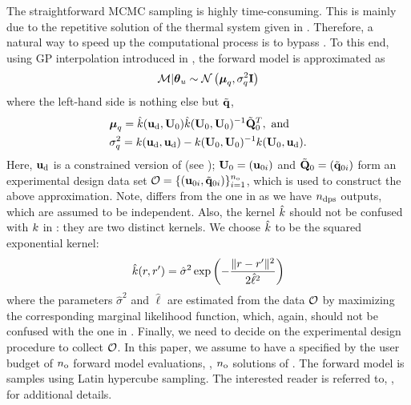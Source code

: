 The straightforward MCMC sampling is highly time-consuming. This is mainly due to the repetitive solution of the thermal system given in . Therefore, a natural way to speed up the computational process is to bypass . To this end, using GP interpolation introduced in , the forward model is approximated as
\begin{equation} \elabel{gp-approximation}
  \model | \vparam_\u \sim \gaussian{\vMean_\T}{\sigma^2_\T \mI}
\end{equation}
where the left-hand side is nothing else but $\tilde{\mathbf{q}}$,
\begin{align*}
  & \vMean_\T = \hat{\fCov}(\vu_\data, \mU_0) \hat{\fCov}(\mU_0, \mU_0)^{-1} \mmT_0^T, \text{ and} \\
  & \sigma^2_\T = \fCov{\vu_\data, \vu_\data} - \fCov{\mU_0, \mU_0}^{-1} \fCov{\mU_0, \vu_\data}.
\end{align*}
Here, $\mathbf{u}_{\text{d}}$ is a constrained version of  (see ); $\mathbf{U}_0 = (\mathbf{u}_{0i})$ and $\tilde{\mathbf{Q}}_0 = (\tilde{\mathbf{q}}_{0i})$ form an experimental design data set $\mathcal{O} = \{ (\mathbf{u}_{0i}, \tilde{\mathbf{q}}_{0i}) \}_{i = 1}^{n_\text{o}}$, which is used to construct the above approximation. Note,  differs from the one in  as we have ${n_\text{dps}}$ outputs, which are assumed to be independent. Also, the kernel $\hat{\fCov}$ should not be confused with $\fCov$ in : they are two distinct kernels. We choose $\hat{\fCov}$ to be the squared exponential kernel:
\[
  \hat{\fCov}(\r, \r') = \hat{\sigma}^2 \exp\left(-\frac{\norm{\r - \r'}^2}{2 \hat{\ell}^2}\right)
\]
where the parameters $\hat{\sigma}^2$ and $\hat{\ell}$ are estimated from the data $\mathcal{O}$ by maximizing the corresponding marginal likelihood function, which, again, should not be confused with the one in . Finally, we need to decide on the experimental design procedure to collect $\mathcal{O}$. In this paper, we assume to have a specified by the user budget of ${n_\text{o}}$ forward model evaluations, \ie, ${n_\text{o}}$ solutions of . The forward model is samples using Latin hypercube sampling. The interested reader is referred to, \eg, \cite{rasmussen2006} for additional details.


